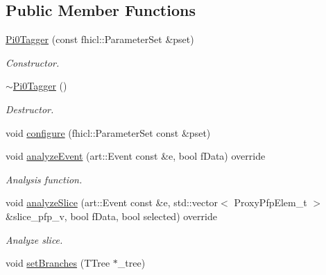 \subsection*{Public Member Functions}
\begin{DoxyCompactItemize}
\item 
\hyperlink{classanalysis_1_1Pi0Tagger_a39627bb5408b7dbecaa2d0e21d0b9899}{Pi0\+Tagger} (const fhicl\+::\+Parameter\+Set \&pset)
\begin{DoxyCompactList}\small\item\em Constructor. \end{DoxyCompactList}\item 
\hyperlink{classanalysis_1_1Pi0Tagger_af054b6d41d9454f6ecc1891fcea24bca}{$\sim$\+Pi0\+Tagger} ()\hypertarget{classanalysis_1_1Pi0Tagger_af054b6d41d9454f6ecc1891fcea24bca}{}\label{classanalysis_1_1Pi0Tagger_af054b6d41d9454f6ecc1891fcea24bca}

\begin{DoxyCompactList}\small\item\em Destructor. \end{DoxyCompactList}\item 
void \hyperlink{classanalysis_1_1Pi0Tagger_a7daaccd1915ec191491536016e3564a8}{configure} (fhicl\+::\+Parameter\+Set const \&pset)
\item 
void \hyperlink{classanalysis_1_1Pi0Tagger_a0a67b1b24417d854f946cd8f5e88771f}{analyze\+Event} (art\+::\+Event const \&e, bool f\+Data) override\hypertarget{classanalysis_1_1Pi0Tagger_a0a67b1b24417d854f946cd8f5e88771f}{}\label{classanalysis_1_1Pi0Tagger_a0a67b1b24417d854f946cd8f5e88771f}

\begin{DoxyCompactList}\small\item\em Analysis function. \end{DoxyCompactList}\item 
void \hyperlink{classanalysis_1_1Pi0Tagger_a98c8d3f92ce5a5fa1f45537a19671cdd}{analyze\+Slice} (art\+::\+Event const \&e, std\+::vector$<$ Proxy\+Pfp\+Elem\+\_\+t $>$ \&slice\+\_\+pfp\+\_\+v, bool f\+Data, bool selected) override
\begin{DoxyCompactList}\small\item\em Analyze slice. \end{DoxyCompactList}\item 
void \hyperlink{classanalysis_1_1Pi0Tagger_a300c79be4d79c50d28347b4ae6270029}{set\+Branches} (T\+Tree $\ast$\+\_\+tree)\hypertarget{classanalysis_1_1Pi0Tagger_a300c79be4d79c50d28347b4ae6270029}{}\label{classanalysis_1_1Pi0Tagger_a300c79be4d79c50d28347b4ae6270029}


\end{DoxyCompactItemize}
